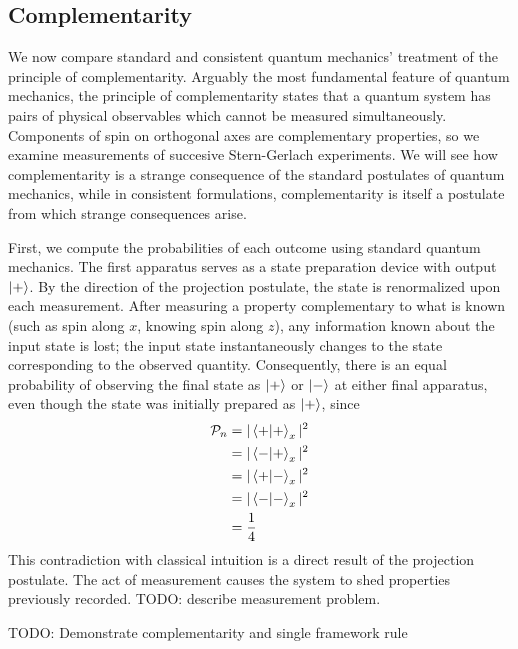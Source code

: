 \subsection{Complementarity}

We now compare standard and consistent quantum mechanics' treatment of the principle of complementarity. Arguably the most fundamental feature of quantum mechanics, the principle of complementarity states that a quantum system has pairs of physical observables which cannot be measured simultaneously. Components of spin on orthogonal axes are complementary properties, so we examine measurements of succesive Stern-Gerlach experiments. We will see how complementarity is a strange consequence of the standard postulates of quantum mechanics, while in consistent formulations, complementarity is itself a postulate from which strange consequences arise.

First, we compute the probabilities of each outcome using standard quantum mechanics. The first apparatus serves as a state preparation device with output $\ket{+}$. By the direction of the projection postulate, the state is renormalized upon each measurement. After measuring a property complementary to what is known (such as spin along $x$, knowing spin along $z$), any information known about the input state is lost; the input state instantaneously changes to the state corresponding to the observed quantity. Consequently, there is an equal probability of observing the final state as $\ket{+}$ or $\ket{-}$ at either final apparatus, even though the state was initially prepared as $\ket{+}$, since
\begin{align*}
    \mathcal{P}_n &= |\braket{+|+}_x|^2 \\
                  &= |\braket{-|+}_x|^2 \\
                  &= |\braket{+|-}_x|^2 \\
                  &= |\braket{-|-}_x|^2 \\
                  &= \frac{1}{4}
\end{align*}
This contradiction with classical intuition is a direct result of the projection postulate. The act of measurement causes the system to shed properties previously recorded. TODO: describe measurement problem.

TODO: Demonstrate complementarity and single framework rule

